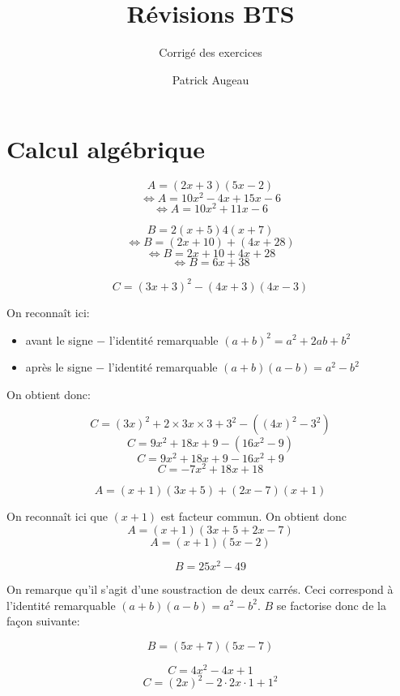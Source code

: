 \documentclass[a4paper,11pt]{scrartcl}
\title{Révisions BTS}
\subtitle{Corrigé des exercices}
\author{Patrick Augeau}
\begin{document}
\maketitle


\section*{Calcul algébrique}



$$A = (2x+3) (5x-2)$$
$$\Leftrightarrow A = 10x^2 - 4x + 15x - 6$$
$$\Leftrightarrow A = 10x^2 + 11x - 6$$

\trait

$$B = 2(x+5) 4(x+7)$$
$$\Leftrightarrow B = (2x + 10) + (4x + 28)$$
$$\Leftrightarrow B = 2x + 10 + 4x + 28$$
$$\Leftrightarrow B = 6x + 38$$

\trait

$$C = (3x+3)^2 - (4x+3)(4x-3)$$

On reconnaît ici:

\begin{itemize}
\item avant le signe $-$ l'identité remarquable $(a+b)^2 = a^2 + 2ab + b^2$
\item après le signe $-$ l'identité remarquable $(a+b)(a-b) = a^2 - b^2$
\end{itemize}


On obtient donc:

$$C = (3x)^2 + 2 \times 3x \times 3 + 3^2 - ((4x)^2 - 3^2)$$
$$C = 9x^2 + 18x + 9 - (16x^2 - 9)$$
$$C = 9x^2 + 18x + 9 - 16x^2 + 9$$
$$C = -7x^2 + 18x + 18$$




$$A = (x+1)(3x+5) + (2x-7)(x+1)$$

On reconnaît ici que $(x+1)$ est facteur commun. On obtient donc
$$A = (x+1)(3x+5+2x-7)$$
$$A = (x+1)(5x-2)$$

\trait

$$B = 25x^2 - 49$$

On remarque qu'il s'agit d'une soustraction de deux carrés. Ceci correspond à l'identité remarquable $(a+b)(a-b) = a^2 - b^2$. $B$ se factorise donc de la façon suivante:

$$B = (5x+7)(5x-7)$$

\trait

$$C = 4x^2 - 4x + 1$$
$$C = (2x)^2 - 2 \cdot 2x \cdot 1 + 1^2$$
\end{document}
